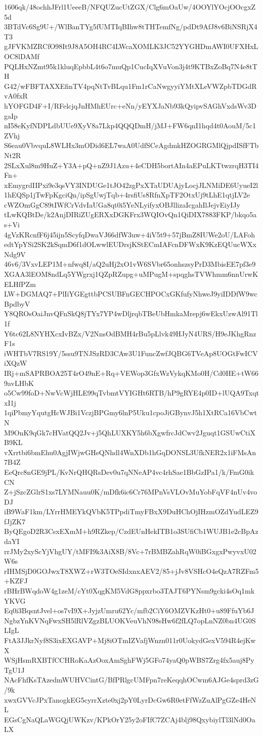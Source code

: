 1606qk/48ochhJFrl1UeeeB/NFQUZucUtZGX/Clg6mOaUw/4OOYlYOcjOOcgxZ5d
3BTdVc6Sg9U+/WlBanTYg5fUMTIqBIhw8tTHTemfNg/pdDt9AfJ8v6BiNSRjX4T3
gJFVKMZRCfO98It9J8A5OH4RC4LWcaXOMLK3JC52YYGHDmAWI0UFXHxLOC8lDAMf
PQLHxNZmt95k1kluqEpbbL4t6o7muQp1CucIqXVuVon3j4t9KTBxZoBq7N4e8tTH
G42/wFBFTAXXEfinTV4pqNtTvBLqu1Fm1rCaNwgyyiYMtXLeVWZpbTDGdRvA0fxR
hYOFGD4F+I/RFelcjqJnHMhEUrc+eNn/yEYXJaNb93kQyipvSAGhVxdsWv3DgaIp
nI58eKyfNDPLdbUUe9XyV8a7Lkp4QQQDmH/jMJ+FW6qnI1hqd4t0AouM/5c1ZVhj
S6eau0VbvquL8WLHx3mODid6EL7waA0UdfSCeAgdmkHZOGRGMlQjpdISfFTbNt2R
2SLxXul8m9HuZ+Y3A+pQ+nZ9J1Azu+4eCDH5bortAIn4aEPuLKTtwzrqH3TI4Fn+
xEmygrdIIPxi9e3qsVY3INDUGe1tJO42zgPxXTaUDUAjyLocjJLNMiDE6UyueI2l
1hEQSp1jTwFpKgciQn/ipSgUwjTqb+4rsfiUs8RfnXpTF2OtxUj9tLhE1qtjLV2e
cWZOmGgC89tIWfCrVdvIaUGa8qt0i5YeNLyifyxOBJllizaIcgahIlJejvEiyIJy
tLwKQBtDe/k2AnjDIRiZUgERXxDGKFrx3WQIOvQn1QiDIX7883FKP/bkqo5as+Vi
4gVzKRcnfF6j45ijn5ScyfqDwaVJ66dfW3uw+4iV5t9+57jBmZ8IUWe2oU/LAFoh
edtYpYSi2SK2kSqmD6f1dOLwwlEUDrsjKStECmIAFcnDFWxK9KzEQUucWXxNdg9V
46v6/3VxvLEP1M+nfwq8I/aQ2uHj2xO1vW6SVbr65onhszsyPrD3MbisEE7pf3e9
XGAA3lEOM8ndLq5YWgrxj1QZpRZupg+uMPugM+spqghsTVWhmm6nnUrwKELHfPZm
LW+DGMAQ7+PlIiYGEgttbPCSUBFnGECHPOCxGKfufyNhweJ9yiIDDfW9wcBpdbyV
Y8QROsOaiJnvQFnSkQ8jTYx7YP4wDljrqbTBeUbHmkaMrepj6wEkxUzwAl91Tl1f
Y6tc62L8NYHXcxIvBZx/V2NnsOdBMH4rBu5pLlvk49HJyN4URS/H9eJKhgRnzF1s
iWHTbV7RS19Y/5ssu9TNJSzRD3CAw3U1FuncZwfJQBG6TVeAp8UOGtFwICViXQzW
IRj+mSAPRBOA25T4rO49nE+Rq+VEWop3GfxWzVykqKMo0H/Cd0HE+tW669avLHbK
o5Cw99foD+NwVcWjHLE99qTvbmtVYIGHt6RTB/hP9gRYE4p0ID+lUQA9TxqtxI1j
1qiPbmyYqutgHcWJBi1VczjBPGmy6lnP5Uku1cpoJiGBynvJ5h1XtRCa16VbCwtN
M9OnK9qGk7cHVatQQ2Jv+j5QhLUXKY5h6bXgwfrcJdCwv2Jguqt1GSUwCtiXB9KL
vXrrtbi6bmEhu0AgjIWjwGHeQNhdl4WnXDb1hGqDONSL3UfkNER2x1iFMsAn7B4Z
EeQrc8nGE9jPL/KvNrQHQRsDev0u7qNNeAP4vc4rhSae1BbGzIPa1/k/FmG0ikCN
Z+jSzcZGlrS1xs7LYMNauu0K/mDfk6ic6Cr76MPnVsVLOvMuYobFqVF4nUv4voDJ
iB9WaF1km/LYrrHMEYkQVbK5TPpdiTmyFBxX9DuHChOjIHzmOZdYudLEZ9fJjZK7
ByQEgoD2R3CsxEXmM+h9RZkep/CzdEUnHekITB1o3SUfiCb1WUJB1e2cBpAzdaYI
rrJMy2xyScYjVhgUY/tMFI9k3AiX8B/8Vc+7rBMBZahRqW0iBGxgxPwyvxU02W6s
rIHMSjD0GOJwxT8XWZ+rW3TOeSIdxnxAEV2/85+jJv8VSHcO4eQzA7RZFm5+KZFJ
rBHrBWqdoW4g1zeM/cYt0XqgKM5VdG8ppxrbo3TAJT6PYNsm9gcki4sOq1mkYKVG
Eq0i3BqsntJvel+os7vI9X+JyjzUmru62Yc/mfb2CiY6OMZVKzHt0+u89FfuYb6J
NgbzYnKVNqFwxSH5lRlVZgzBLUOKVeuVhN98sHw6f2fLQ7opLnNZ0bn4UG0SLIgL
FtA3JJkrNyf8S3ixEXGAVP+Mj8iOTmIZVafjWnzn011r0UokydGexV594R4ejKwX
WSjHsmRXBTfCCHRoKaAzOoxAmSghFWj5GFo74yaQ0pWBS7Zrg4fx5auj8PyTgU1J
NAcFhfKsTAzedmWUHVCintG/BfPRlgcUMFpn7reKeqqhOCwm6AJGe4sprd3zG/9k
xwxGVVcJPxTanogkEG5cyrrXzte0xj2pY0LyrDcGw6R0etFfWzZuAlPgGZe4HeNL
EGsCgNaQLaWGQjUWKzv/KPkOrY25y2oFIfC7ZCAj4blj98QxybiylTl3lNd0OaLX
